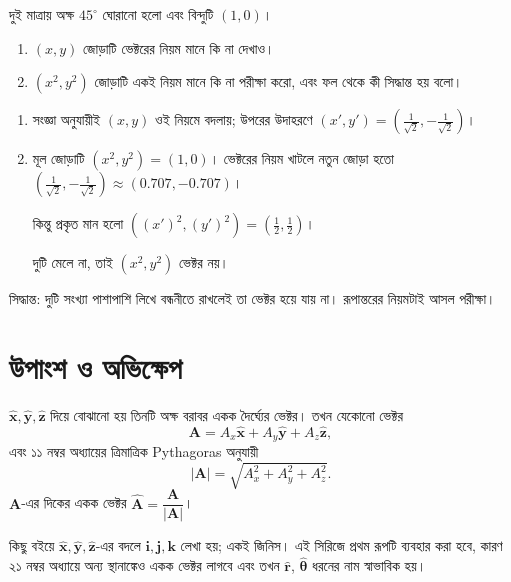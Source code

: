 \documentclass[11pt]{article}
\begin{document}
 দুই মাত্রায় অক্ষ $45^{\circ}$ ঘোরানো হলো এবং বিন্দুটি $(1,0)$।
\begin{enumerate}
  \item $(x,y)$ জোড়াটি ভেক্টরের নিয়ম মানে কি না দেখাও।
  \item $\left( x^{2}, y^{2} \right)$ জোড়াটি একই নিয়ম মানে কি না পরীক্ষা
        করো, এবং ফল থেকে কী সিদ্ধান্ত হয় বলো।
\end{enumerate}

\begin{sol}
\begin{enumerate}
  \item সংজ্ঞা অনুযায়ীই $(x,y)$ ওই নিয়মে বদলায়; উপরের উদাহরণে
        $(x', y') = \left( \tfrac{1}{\sqrt{2}}, -\tfrac{1}{\sqrt{2}} \right)$।
  \item মূল জোড়াটি $\left( x^{2}, y^{2} \right) = (1, 0)$। ভেক্টরের নিয়ম
        খাটলে নতুন জোড়া হতো
        $\left( \tfrac{1}{\sqrt{2}}, -\tfrac{1}{\sqrt{2}} \right)
        \approx (0.707, -0.707)$।

        কিন্তু প্রকৃত মান হলো $\left( (x')^{2}, (y')^{2} \right)
        = \left( \tfrac{1}{2}, \tfrac{1}{2} \right)$।

        দুটি মেলে না, তাই $\left( x^{2}, y^{2} \right)$ ভেক্টর নয়।
\end{enumerate}
সিদ্ধান্ত: দুটি সংখ্যা পাশাপাশি লিখে বন্ধনীতে রাখলেই তা ভেক্টর হয়ে যায় না।
রূপান্তরের নিয়মটাই আসল পরীক্ষা।
\end{sol}

\section{উপাংশ ও অভিক্ষেপ}

\begin{idea}[একক ভেক্টর ও উপাংশ]
$\hat{\mathbf{x}}, \hat{\mathbf{y}}, \hat{\mathbf{z}}$ দিয়ে বোঝানো হয় তিনটি
অক্ষ বরাবর একক দৈর্ঘ্যের ভেক্টর। তখন যেকোনো ভেক্টর
\[
  \mathbf{A} = A_{x}\hat{\mathbf{x}} + A_{y}\hat{\mathbf{y}}
             + A_{z}\hat{\mathbf{z}} ,
\]
এবং ১১ নম্বর অধ্যায়ের ত্রিমাত্রিক Pythagoras অনুযায়ী
\[
  |\mathbf{A}| = \sqrt{A_{x}^{2}+A_{y}^{2}+A_{z}^{2}} .
\]
$\mathbf{A}$-এর দিকের একক ভেক্টর
$\hat{\mathbf{A}} = \dfrac{\mathbf{A}}{|\mathbf{A}|}$।
\end{idea}

কিছু বইয়ে $\hat{\mathbf{x}}, \hat{\mathbf{y}}, \hat{\mathbf{z}}$-এর বদলে
$\mathbf{i}, \mathbf{j}, \mathbf{k}$ লেখা হয়; একই জিনিস। এই সিরিজে প্রথম
রূপটি ব্যবহার করা হবে, কারণ ২১ নম্বর অধ্যায়ে অন্য স্থানাঙ্কেও একক ভেক্টর
লাগবে এবং তখন $\hat{\mathbf{r}}$, $\hat{\boldsymbol{\theta}}$ ধরনের নাম
স্বাভাবিক হয়।
\end{document}
